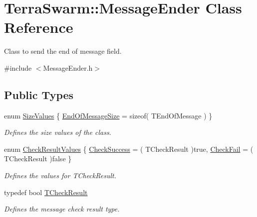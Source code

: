 \hypertarget{class_terra_swarm_1_1_message_ender}{\section{Terra\-Swarm\-:\-:Message\-Ender Class Reference}
\label{class_terra_swarm_1_1_message_ender}
}


Class to send the end of message field.  




{\ttfamily \#include $<$Message\-Ender.\-h$>$}

\subsection*{Public Types}
\begin{DoxyCompactItemize}
\item 
enum \hyperlink{class_terra_swarm_1_1_message_ender_a69b4e82c4fb985160b5bbd11c0fc65ff}{Size\-Values} \{ \hyperlink{class_terra_swarm_1_1_message_ender_a69b4e82c4fb985160b5bbd11c0fc65ffa61b601ee3929906b25d5d72130acc98e}{End\-Of\-Message\-Size} = sizeof( T\-End\-Of\-Message )
 \}
\begin{DoxyCompactList}\small\item\em Defines the size values of the class. \end{DoxyCompactList}\item 
enum \hyperlink{class_terra_swarm_1_1_message_ender_ad7afbe0b4913ddd8eebac745d343e1cd}{Check\-Result\-Values} \{ \hyperlink{class_terra_swarm_1_1_message_ender_ad7afbe0b4913ddd8eebac745d343e1cda73d1f17b583961365d46511dc24a95a0}{Check\-Success} = ( T\-Check\-Result )true, 
\hyperlink{class_terra_swarm_1_1_message_ender_ad7afbe0b4913ddd8eebac745d343e1cda1a4cb11f4fcd5e5257c47f27650c9cdf}{Check\-Fail} = ( T\-Check\-Result )false
 \}
\begin{DoxyCompactList}\small\item\em Defines the values for T\-Check\-Result. \end{DoxyCompactList}\item 
typedef bool \hyperlink{class_terra_swarm_1_1_message_ender_a4f3f1bf696190619eb5580c3007ac83a}{T\-Check\-Result}
\begin{DoxyCompactList}\small\item\em Defines the message check result type. \end{DoxyCompactList}\end{DoxyCompactItemize}

